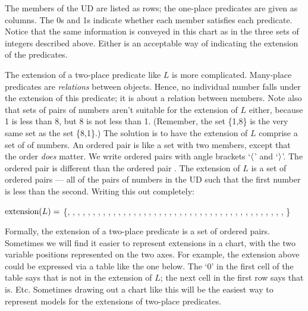 The members of the UD are listed as rows; the one-place predicates are given as columns. The 0s and 1s indicate whether each member satisfies each predicate. Notice that the same information is conveyed in this chart as in the three sets of integers described above. Either is an acceptable way of indicating the extension of the predicates.

The extension of a two-place predicate like $L$ is more complicated. {\color{black}Many-place predicates are \textit{relations} between objects.} Hence, no individual number falls under the extension of this predicate; it is about a relation between members. Note also that sets of pairs of numbers aren't suitable for the extension of $L$ either, because 1 is less than 8, but 8 is not less than 1. (Remember, the set \{1,8\} is the very same set as the set \{8,1\}.) The solution is to have the extension of $L$ comprise a set of  of numbers. An ordered pair is like a set with two members, except that the order \emph{does} matter. We write ordered pairs with angle brackets `$\langle$' and `$\rangle$'. The ordered pair \mbox{} is different than the ordered pair \mbox{}. The extension of $L$ is a set of ordered pairs --- all of the pairs of numbers in the UD such that the first number is less than the second. Writing this out completely:


$\mbox{extension}(L)=$ \{, , , , , , , , ,
, , , , , , , ,
, , , , , , ,
, , , , , ,
, , , , ,
, , , , 
, , ,
, 
%
\}

Formally, the extension of a two-place predicate is a set of ordered pairs. Sometimes we will find it easier to represent extensions in a chart, with the two variable positions represented on the two axes. For example, the extension above could be expressed via a table like the one below. The `0' in the first cell of the table says that  is not in the extension of $L$; the next cell in the first row says that  is. Etc. Sometimes drawing out a chart like this will be the easiest way to represent models for the extensions of two-place predicates.




